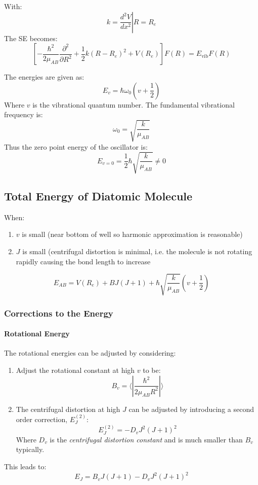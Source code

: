 \documentclass[12pt]{article}
\begin{document}
With:
\[k = \left.\frac{d^2V}{dx^2}\right|R=R_e\]
The SE becomes:
\[\left[ -\frac{\hbar^2}{2\mu_{AB}}\frac{\partial^2}{\partial R^2} + \frac12 k(R-R_e)^2 + V(R_e)\right] F(R) = E_\text{vib}F(R)\]

The energies are given as:
\[E_v = \hbar \omega_0(v+\frac12)\]
Where $v$ is the vibrational quantum number. The fundamental vibrational frequency is:
\[\omega_0 = \sqrt{\frac{k}{\mu_{AB}}}\]
Thus the zero point energy of the oscillator is:
\[E_{v=0} = \frac12\hbar\sqrt{\frac{k}{\mu_{AB}}} \neq 0\]


\subsection{Total Energy of Diatomic Molecule}

When:
\begin{enumerate}
    \item $v$ is small (near bottom of well so harmonic approximation is reasonable)
    \item $J$ is small (centrifugal distortion is minimal, i.e. the molecule is not rotating rapidly causing the bond length to increase
\end{enumerate}
\[ E_{AB} = V(R_e) + BJ(J+1) + \hbar\sqrt{\frac{k}{\mu_{AB}}}(v+\frac12)\]

\subsubsection{Corrections to the Energy}

\paragraph{Rotational Energy}
The rotational energies can be adjusted by considering:

\begin{enumerate}[i]
    \item Adjust the rotational constant at high $v$ to be:
    \[B_v = \langle|\frac{\hbar^2}{2\mu_{AB}R^2}|\rangle\]
    \item The centrifugal distortion at high $J$ can be adjusted by introducing a second order correction, $E_J^(2)$:
    \[ E_J^(2) = -D_vJ^2(J+1)^2\]
    Where $D_v$ is the \textit{centrifugal distortion constant} and is much smaller than $B_v$ typically.
\end{enumerate}

This leads to:
\[E_J = B_vJ(J+1) - D_vJ^2(J+1)^2\]
\end{document}
